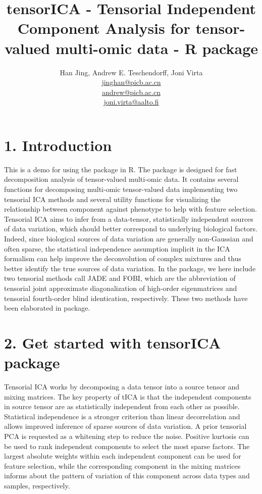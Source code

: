 \documentclass{article}
\begin{document}

\title{tensorICA - Tensorial Independent Component Analysis for tensor-valued multi-omic data - R package}
\author{Han Jing, Andrew E. Teschendorff, Joni Virta
    \\
    \href{mailto:jinghan@picb.ac.cn}{jinghan@picb.ac.cn}
    \\
    \href{mailto:andrew@picb.ac.cn}{andrew@picb.ac.cn}
    \\
    \href{mailto:joni.virta@aalto.fi}{joni.virta@aalto.fi}}
\maketitle   

\tableofcontents

\section*{1. Introduction}
This is a demo for using the \verb@tensorICA@ package in R. The \verb@tensorICA@ package is designed for fast decomposition analysis of tensor-valued multi-omic data. It contains several functions for decomposing multi-omic tensor-valued data implementing two tensorial ICA methods and several utility functions for visualizing the relationship between component against phenotype to help with feature selection. Tensorial ICA aims to infer from a data-tensor, statistically independent sources of data variation, which should better correspond to underlying biological factors. Indeed, since biological sources of data variation are generally non-Gaussian and often sparse, the statistical independence assumption implicit in the ICA formalism can help improve the deconvolution of complex mixtures and thus better identify the true sources of data variation. In the package, we here include two tensorial methods call JADE and FOBI, which are the abbreviation of tensorial joint approximate diagonalization of high-order eigenmatrices and tensorial fourth-order blind identication, respectively. These two methods have been elaborated in \verb@tensorBSS@ package.
\section*{2. Get started with tensorICA package}
Tensorial ICA works by decomposing a data tensor into a source tensor and mixing matrices. The key property of tICA is that the independent components in source tensor are as statistically independent from each other as possible. Statistical independence is a stronger criterion than linear decorrelation and allows improved inference of sparse sources of data variation. A prior tensorial PCA is requested as a whitening step to reduce the noise. Positive kurtosis can be used to rank independent components to select the most sparse factors. The largest absolute weights within each independent component can be used for feature selection, while the corresponding component in the mixing matrices informs about the pattern of variation of this component across data types and samples, respectively. 
\end{document}
